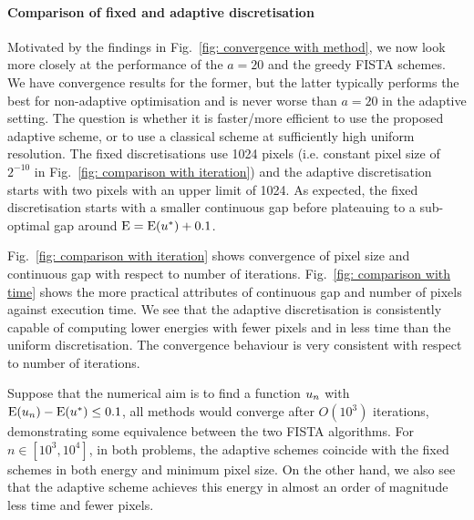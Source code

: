 \documentclass[smallextended]{svjour3}
\newcommand{\op}[1]{\operatorname{#1}}
\newcommand{\1}{\F{1}}
\newcommand*{\var}[1]{%
	\IfEqCase{#1}{%
		{0}{u}%
		{1}{v}%
		{2}{w}%
	}[u#1]%
}
\begin{document}
	\paragraph{Comparison of fixed and adaptive discretisation}
	Motivated by the findings in Fig.~\ref{fig: convergence with method}, we now look more closely at the performance of the $a=20$ and the greedy FISTA schemes. We have convergence results for the former, but the latter typically performs the best for non-adaptive optimisation and is never worse than $a=20$ in the adaptive setting. The question is whether it is faster/more efficient to use the proposed adaptive scheme, or to use a classical scheme at sufficiently high uniform resolution. The fixed discretisations use 1024 pixels (i.e. constant pixel size of $2^{-10}$ in Fig.~\ref{fig: comparison with iteration}) and the adaptive discretisation starts with two pixels with an upper limit of 1024. As expected, the fixed discretisation starts with a smaller continuous gap before plateauing to a sub-optimal gap around $\op{E}=\op{E}(\var0^*) + 0.1$.
	
	Fig.~\ref{fig: comparison with iteration} shows convergence of pixel size and continuous gap with respect to number of iterations. Fig.~\ref{fig: comparison with time} shows the more practical attributes of continuous gap and number of pixels against execution time. We see that the adaptive discretisation is consistently capable of computing lower energies with fewer pixels and in less time than the uniform discretisation. The convergence behaviour is very consistent with respect to number of iterations.
	
	Suppose that the numerical aim is to find a function $\var0_n$ with $\op{E}(\var0_n)-\op{E}(\var0^*)\leq 0.1$, all methods would converge after $O(10^3)$ iterations, demonstrating some equivalence between the two FISTA algorithms. For $n\in[10^3,10^4]$, in both problems, the adaptive schemes coincide with the fixed schemes in both energy and minimum pixel size. On the other hand, we also see that the adaptive scheme achieves this energy in almost an order of magnitude less time and fewer pixels.
	
\end{document}

